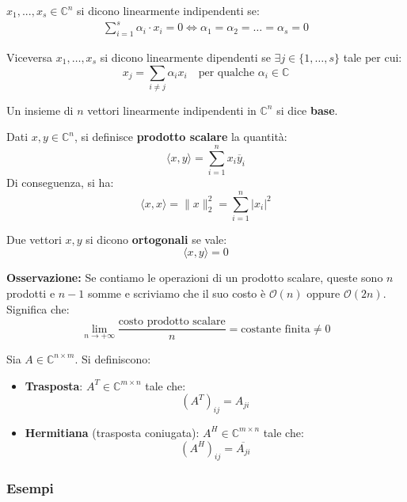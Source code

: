 \documentclass[a4paper,12pt]{article}
\begin{document}
	\begin{tcolorbox}[title=Definizione]
		$x_1,...,x_s \in \mathbb{C}^n$ si dicono linearmente indipendenti se:
		\begin{align*}
			\sum_{i=1}^{s} \alpha_i \cdot x_i = 0 \iff \alpha_1 = \alpha_2 = \dots = \alpha_s = 0
		\end{align*}
	\end{tcolorbox}
	Viceversa $x_1, \dots, x_s$ si dicono linearmente dipendenti se $\exists j \in \{1, \dots, s\}$ tale per cui:
	\[
	x_j = \sum_{i \neq j} \alpha_i x_i \quad \text{per qualche } \alpha_i \in \mathbb{C}
	\]
	
	\begin{tcolorbox}[title=Definizione]
		Un insieme di $n$ vettori linearmente indipendenti in $\mathbb{C}^n$ si dice \textbf{base}.
	\end{tcolorbox}
	
	\begin{tcolorbox}[title=Definizione]
		Dati $x, y \in \mathbb{C}^n$, si definisce \textbf{prodotto scalare} la quantità:
		\[
		\langle x, y \rangle = \sum_{i=1}^{n} x_i \overline{y}_i
		\]
		Di conseguenza, si ha:
		\[
		\langle x, x \rangle = \|x\|_2^2 = \sum_{i=1}^{n} |x_i|^2
		\]
	\end{tcolorbox} 
	\begin{tcolorbox}[title=Definizione]
		Due vettori $x, y$ si dicono \textbf{ortogonali} se vale:
		\[
		\langle x, y \rangle = 0
		\]
	\end{tcolorbox}
	
	\textbf{Osservazione:} Se contiamo le operazioni di un prodotto scalare, queste sono $n$ prodotti e $n-1$ somme e scriviamo che il suo costo è $\mathcal{O}(n)$ oppure $\mathcal{O}(2n)$. Significa che:
	\[
	\lim_{n \to +\infty} \frac{\text{costo prodotto scalare}}{n} = \text{costante finita} \neq 0
	\]
	\begin{tcolorbox}[title=Definizione (Trasposta e Trasposta Coniugata)]
		Sia $A \in \mathbb{C}^{n \times m}$. Si definiscono:
		\begin{itemize}
			\item \textbf{Trasposta}: $A^T \in \mathbb{C}^{m \times n}$ tale che:
			\[
			(A^T)_{ij} = A_{ji}
			\]
			\item \textbf{Hermitiana} (trasposta coniugata): $A^H \in \mathbb{C}^{m \times n}$ tale che:
			\[
			(A^H)_{ij} = \overline{A_{ji}}
			\]
		\end{itemize}
	\end{tcolorbox}
	
	\subsubsection*{Esempi}
	
\end{document}
